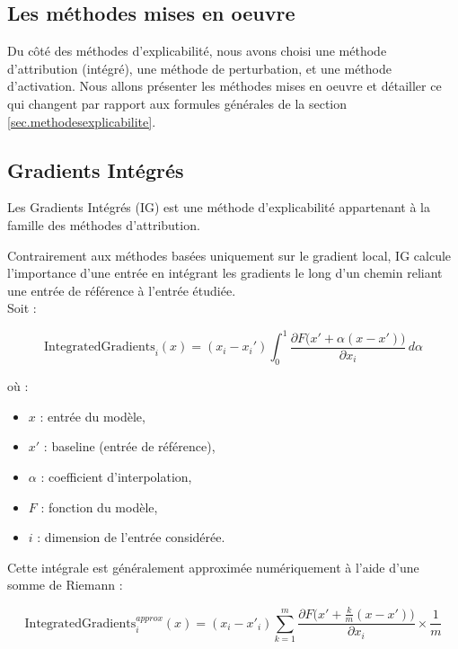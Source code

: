 \documentclass{ir}
\begin{document}
\subsection{Les méthodes mises en oeuvre}

Du côté des méthodes d'explicabilité, nous avons choisi une méthode d'attribution (intégré), une méthode de perturbation, et une méthode d'activation.
Nous allons présenter les méthodes mises en oeuvre et détailler ce qui changent par rapport aux formules générales de la section \ref{sec.methodesexplicabilite}.

\subsection{Gradients Intégrés}\label{subsec:ig}

Les Gradients Intégrés (IG) est une méthode d'explicabilité appartenant à la famille des méthodes d'attribution.

Contrairement aux méthodes basées uniquement sur le gradient local, IG calcule l'importance d'une entrée en intégrant les gradients le long d'un chemin reliant une entrée de référence à l'entrée étudiée.\\

Soit :

\begin{equation}
\mathrm{IntegratedGradients}_i(x)
=
(x_i - x_i')
\int_{0}^{1}
\frac{\partial F\big(x' + \alpha (x - x')\big)}
{\partial x_i}
\, d\alpha
\end{equation}

où :
\begin{itemize}
    \item $x$ : entrée du modèle,
    \item $x'$ : baseline (entrée de référence),
    \item $\alpha$ : coefficient d'interpolation,
    \item $F$ : fonction du modèle,
    \item $i$ : dimension de l'entrée considérée.\\
\end{itemize}

Cette intégrale est généralement approximée numériquement à l'aide d'une somme de Riemann :

\begin{equation}\label{equation:riemannapprox}
\mathrm{IntegratedGradients}^{approx}_{i}(x)
=
(x_i - x'_i)
\sum_{k=1}^{m}
\frac{\partial F\big(x'+\frac{k}{m}(x-x')\big)}
{\partial x_i}
\times
\frac{1}{m}
\end{equation}
\end{document}
